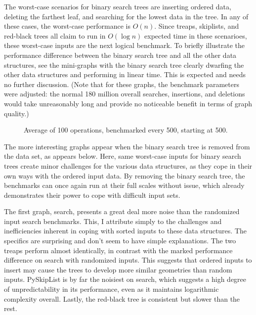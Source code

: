 \documentclass{article}
\begin{document}
The worst-case scenarios for binary search trees are inserting ordered data, deleting the farthest leaf, and searching for the lowest data in the tree. In any of these cases, the worst-case performance is $O(n)$. Since treaps, skiplists, and red-black trees all claim to run in $O(\log n)$ expected time in these scenarioes, these worst-case inputs are the next logical benchmark. To briefly illustrate the performance difference between the binary search tree and all the other data structures, see the mini-graphs with the binary search tree clearly dwarfing the other data structures and performing in linear time. This is expected and needs no further discussion. (Note that for these graphs, the benchmark parameters were adjusted: the normal 180 million overall searches, insertions, and deletions would take unreasonably long and provide no noticeable benefit in terms of graph quality.)

\begin{figure}[h]
    \centering
    
    
    
    \caption{Average of 100 operations, benchmarked every 500, starting at 500.}
\end{figure}

The more interesting graphs appear when the binary search tree is removed from the data set, as appears below. Here, same worst-case inputs for binary search trees create minor challenges for the various data structures, as they cope in their own ways with the ordered input data. By removing the binary search tree, the benchmarks can once again run at their full scales without issue, which already demonstrates their power to cope with difficult input sets.



The first graph, search, presents a great deal more noise than the randomized input search benchmarks. This, I attribute simply to the challenges and inefficiencies inherent in coping with sorted inputs to these data structures. The specifics are surprising and don't seem to have simple explanations. The two treaps perform almost identically, in contrast with the marked performance difference on search with randomized inputs. This suggests that ordered inputs to insert may cause the trees to develop more similar geometries than random inputs. PySkipList is by far the noisiest on search, which suggests a high degree of unpredictability in its performance, even as it maintains logarithmic complexity overall. Lastly, the red-black tree is consistent but slower than the rest. 
\end{document}
